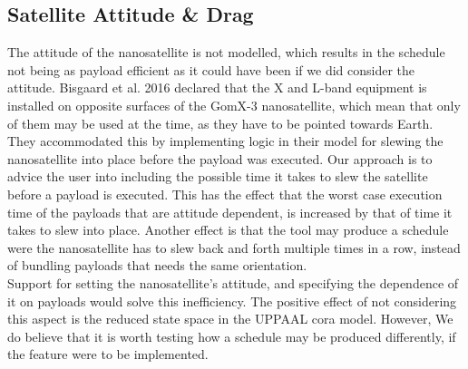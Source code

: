 \subsection{Satellite Attitude \& Drag}
The attitude of the nanosatellite is not modelled, which results in the schedule not being as payload efficient as it could have been if we did consider the attitude. Bisgaard et al. 2016\cite{gomx3} declared that the X and L-band equipment is installed on opposite surfaces of the GomX-3 nanosatellite, which mean that only of them may be used at the time, as they have to be pointed towards Earth. They accommodated this by implementing logic in their model for slewing the nanosatellite into place before the payload was executed. Our approach is to advice the user into including the possible time it takes to slew the satellite before a payload is executed. This has the effect that the worst case execution time of the payloads that are attitude dependent, is increased by that of time it takes to slew into place. Another effect is that the tool may produce a schedule were the nanosatellite has to slew back and forth multiple times in a row, instead of bundling payloads that needs the same orientation.\\
Support for setting the nanosatellite's attitude, and specifying the dependence of it on payloads would solve this inefficiency.
The positive effect of not considering this aspect is the reduced state space in the UPPAAL \gls{cora} model. However, We do believe that it is worth testing how a schedule may be produced differently, if the feature were to be implemented.

